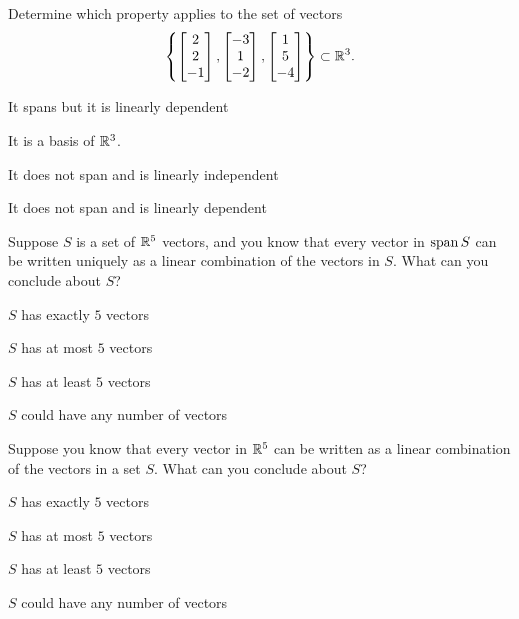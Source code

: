 \begin{readinessAssuranceTest}
\item Determine which property applies to the set of vectors $$\left\{ \begin{bmatrix}  2 \\ 2 \\ -1 \end{bmatrix}, \begin{bmatrix} -3 \\ 1 \\ -2 \end{bmatrix} , \begin{bmatrix} 1 \\ 5 \\ -4 \end{bmatrix}\right\}\subset \mathbb{R}^3.$$
\begin{readinessAssuranceTestChoices}
\item It spans but it is linearly dependent
\item It is a basis of $\mathbb{R}^3$.
\item It does not span and is linearly independent
\item It does not span and is linearly dependent %
\end{readinessAssuranceTestChoices}


\item Suppose \(S\) is a set of \(\mathbb{R}^5\) vectors, and you know that every vector in
      \(\operatorname{span} S\) can be written uniquely as a linear combination of the vectors
      in \(S\).  What can you conclude about \(S\)?
\begin{readinessAssuranceTestChoices}
\item \(S\) has exactly \(5\) vectors
\item \(S\) has at most \(5\) vectors
\item \(S\) has at least \(5\) vectors
\item \(S\) could have any number of vectors
\end{readinessAssuranceTestChoices}

\item Suppose you know that every vector in \(\mathbb{R}^5\) can be written as a linear combination of 
      the vectors in a set \(S\).  What can you conclude about \(S\)?
\begin{readinessAssuranceTestChoices}
\item \(S\) has exactly \(5\) vectors
\item \(S\) has at most \(5\) vectors
\item \(S\) has at least \(5\) vectors
\item \(S\) could have any number of vectors
\end{readinessAssuranceTestChoices}


\end{readinessAssuranceTest}
